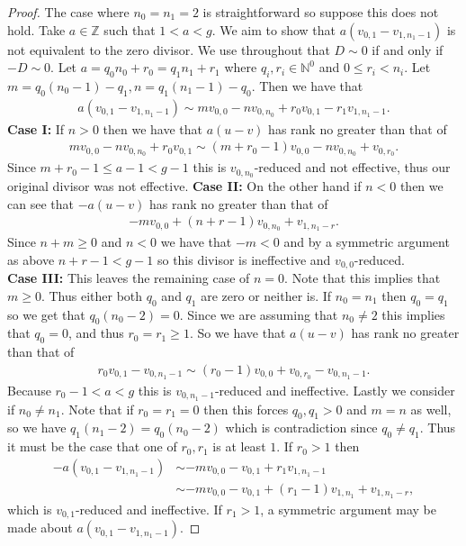 \documentclass[11pt]{article}
\theoremstyle{definition}
\numberwithin{equation}{section}
\newcommand{\N}{\mathbb{N}}
\newcommand{\Z}{\mathbb{Z}}
\begin{document}
\begin{proof}
    The case where $n_0 = n_1 = 2$ is straightforward so suppose this does not hold. Take $a \in \Z$ such that $1<a<g$. We aim to show that $a(v_{0,1}-v_{1,n_1-1})$ is not equivalent to the zero divisor. We use throughout that $D \sim 0$ if and only if $-D \sim 0$. Let $a = q_0n_0+r_0 = q_1n_1+r_1$ where $q_i,r_i \in \N^0$ and $0\leq r_i < n_i$. Let $ m = q_0(n_0-1)-q_1, n = q_1(n_1-1)-q_0$. Then we have that
    \begin{align*}
        a(v_{0,1}-v_{1,n_1-1}) \sim mv_{0,0}-nv_{0,n_0}+r_0v_{0,1}-r_1v_{1,n_1-1}.
    \end{align*}
    \textbf{Case I:}
    If $n>0$ then we have that $a(u-v)$ has rank no greater than that of
    \begin{align*}
        mv_{0,0}-nv_{0,n_0}+r_0v_{0,1} \sim (m+r_0-1)v_{0,0}-nv_{0,n_0}+v_{0,r_0}.
    \end{align*}
    Since $m+r_0-1 \leq a - 1 <g-1$ this is $v_{0,n_0}$-reduced and not effective, thus our original divisor was not effective. 
    \textbf{Case II:}
    On the other hand if $n<0$ then we can see that $-a(u-v)$ has rank no greater than that of
    \begin{align*}
        -mv_{0,0} + (n+r-1)v_{0,n_0} + v_{1,n_1-r}.
    \end{align*}
    Since $n+m \geq 0$ and $n<0$ we have that $-m<0$ and by a symmetric argument as above $n+r-1 <g-1$ so this divisor is ineffective and $v_{0,0}$-reduced.\\
    \textbf{Case III:}
    This leaves the remaining case of $n = 0$. Note that this implies that $m\geq 0$. Thus either both $q_0$ and $q_1$ are zero or neither is. If $n_0 = n_1$ then $q_0 = q_1$ so we get that $q_0(n_0-2) = 0$. Since we are assuming that $n_0 \neq 2$ this implies that $q_0 = 0$, and thus $r_0 = r_1\geq 1$. So we have that $a(u-v)$ has rank no greater than that of
    \begin{align*}
        r_0v_{0,1}-v_{0,n_1-1} \sim (r_0-1)v_{0,0}+v_{0,r_0} -v_{0,n_1-1}.
    \end{align*}
    Because $r_0-1 < a<g$ this is $v_{0,n_1-1}$-reduced and ineffective. Lastly we consider if $n_0 \neq n_1$. Note that if $r_0 = r_1 = 0$ then this forces $q_0,q_1>0$ and $m = n$ as well, so we have $q_1(n_1-2) = q_0(n_0-2)$ which is contradiction since $q_0 \neq q_1$. Thus it must be the case that one of $r_0,r_1$ is at least $1$. If $r_0> 1$ then
    \begin{align*}
        -a(v_{0,1}-v_{1,n_1-1}) &\sim -mv_{0,0} -v_{0,1}+r_1v_{1,n_1-1} \\&\sim -mv_{0,0} -v_{0,1}+(r_1-1)v_{1,n_1}+v_{1,n_1-r},
    \end{align*}
    which is $v_{0,1}$-reduced and ineffective. If $r_1>1$, a symmetric argument may be made about $a(v_{0,1}-v_{1,n_1-1})$.
\end{proof}
\end{document}
